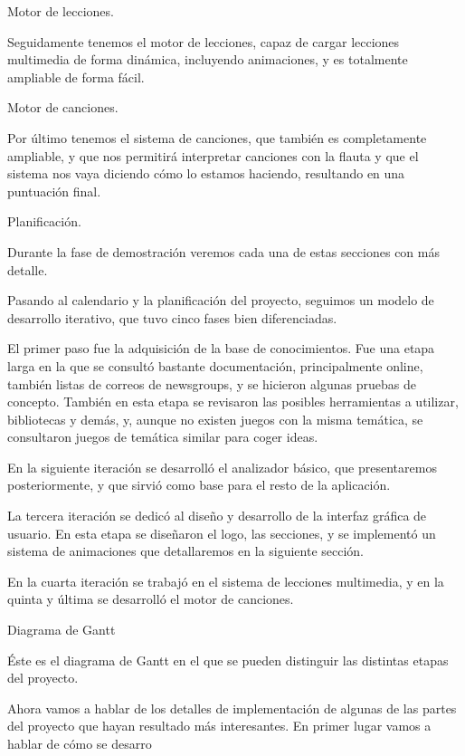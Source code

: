 \documentclass[landscape]{article}
\newenvironment{nota}
{%
\begin{framed} \noindent\itshape
}
{%
\end{framed}\vspace{-0.5cm} }
\begin{document}
\begin{multicols*}{2}
\begin{nota}
  Motor de lecciones.
\end{nota}

Seguidamente tenemos el motor de lecciones, capaz de cargar lecciones multimedia
de forma dinámica, incluyendo animaciones, y es totalmente ampliable de forma
fácil.

\begin{nota}
  Motor de canciones.
\end{nota}

Por último tenemos el sistema de canciones, que también es completamente
ampliable, y que nos permitirá interpretar canciones con la flauta y que el
sistema nos vaya diciendo cómo lo estamos haciendo, resultando en una puntuación
final.

\begin{nota}
  Planificación.
\end{nota}
Durante la fase de demostración veremos cada una de estas secciones con más detalle.

Pasando al calendario y la planificación del proyecto, seguimos un modelo de
desarrollo iterativo, que tuvo cinco fases bien diferenciadas.

 El primer paso fue la adquisición de la base de
conocimientos. Fue una etapa larga en la que se consultó bastante documentación,
principalmente online, también listas de correos de newsgroups, y se hicieron
algunas pruebas de concepto. También en esta etapa se revisaron las posibles
herramientas a utilizar, bibliotecas y demás, y, aunque no existen juegos con la
misma temática, se consultaron juegos de temática similar para coger ideas.

 En la siguiente iteración se desarrolló el analizador básico,
que presentaremos posteriormente, y que sirvió como base para el resto de la
aplicación.

 La tercera iteración se dedicó al diseño y desarrollo de la
interfaz gráfica de usuario. En esta etapa se diseñaron el logo, las secciones,
y se implementó un sistema de animaciones que detallaremos en la siguiente sección.

 En la cuarta iteración se trabajó en el sistema de lecciones
multimedia, y  en la quinta y última se desarrolló el motor de
canciones.

\begin{nota}
  Diagrama de Gantt
\end{nota}

Éste es el diagrama de Gantt en el que se pueden distinguir las distintas
etapas del proyecto.

\begin{nota}
  
\end{nota}

Ahora vamos a hablar de los detalles de implementación de algunas de las partes
del proyecto que hayan resultado más interesantes. En primer lugar vamos a
hablar de cómo se desarro


 \vfill \pagebreak


\end{multicols*}
\end{document}
